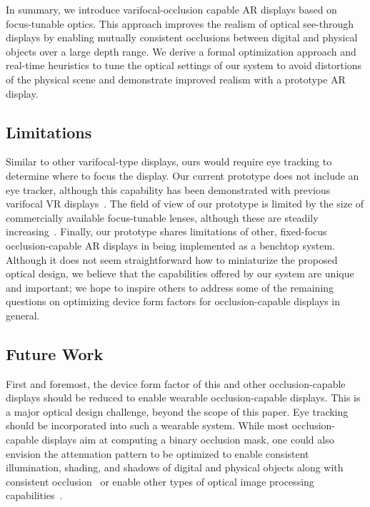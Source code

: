 In summary, we introduce varifocal-occlusion capable AR displays based on focus-tunable optics. This approach improves the realism of optical see-through displays by enabling mutually consistent occlusions between digital and physical objects over a large depth range. We derive a formal optimization approach and real-time heuristics to tune the optical settings of our system to avoid distortions of the physical scene and demonstrate improved realism with a prototype AR display. 

\subsection{Limitations}

Similar to other varifocal-type displays, ours would require eye tracking to determine where to focus the display. Our current prototype does not include an eye tracker, although this capability has been demonstrated with previous varifocal VR displays~\cite{Padmanaban2016Optimizing}. The field of view of our prototype is limited by the size of commercially available focus-tunable lenses, although these are steadily increasing~\cite{Padmanaban2019Autofocals}. Finally, our prototype shares limitations of other, fixed-focus occlusion-capable AR displays in being implemented as a benchtop system. Although it does not seem straightforward how to miniaturize the proposed optical design, we believe that the capabilities offered by our system are unique and important; we hope to inspire others to address some of the remaining questions on optimizing device form factors for occlusion-capable displays in general. 

\subsection{Future Work}

First and foremost, the device form factor of this and other occlusion-capable displays should be reduced to enable wearable occlusion-capable displays. This is a major optical design challenge, beyond the scope of this paper. Eye tracking should be incorporated into such a wearable system. While most occlusion-capable displays aim at computing a binary occlusion mask, one could also envision the attenuation pattern to be optimized to enable consistent illumination, shading, and shadows of digital and physical objects along with consistent occlusion~\cite{bimber2003consistent} or enable other types of optical image processing capabilities~\cite{Wetzstein2010}. 

